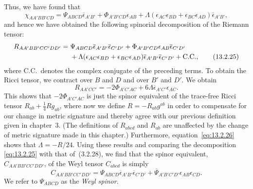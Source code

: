 Thus, we have found that
\begin{equation}
  \chi_{AA'BB'CD}
  =\Psi_{ABCD}\overline\epsilon_{A'B'}
   +\Phi_{A'B'CD}\epsilon_{AB}
   +\Lambda(\epsilon_{AC}\epsilon_{BD}+\epsilon_{BC}\epsilon_{AD})
    \overline\epsilon_{A'B'},
  \tag{13.2.24}\label{eq:13.2.24}
\end{equation}
and hence we have obtained the following spinorial decomposition of the Riemann
tensor:
\begin{align}
  R_{AA'BB'CC'DD'}
  ={}&\Psi_{ABCD}\overline\epsilon_{A'B'}\overline\epsilon_{C'D'}
    +\Phi_{A'B'CD}\epsilon_{AB}\overline\epsilon_{C'D'}\notag\\
   &{}+\Lambda(\epsilon_{AC}\epsilon_{BD}+\epsilon_{BC}\epsilon_{AD})
      \overline\epsilon_{A'B'}\overline\epsilon_{C'D'}
    +\text{C.C.},
  \tag{13.2.25}\label{eq:13.2.25}
\end{align}
where C.C.\ denotes the complex conjugate of the preceding terms. To obtain the
Ricci tensor, we contract over \(B\) and \(D\) and over \(B'\) and \(D'\). We obtain
\begin{equation}
  R_{AA'CC'}=-2\Phi_{A'C'AC}
    +6\Lambda\overline\epsilon_{A'C'}\epsilon_{AC}.
  \tag{13.2.26}\label{eq:13.2.26}
\end{equation}
This shows that \(-2\Phi_{A'C'AC}\) is just the spinor equivalent of the trace-free
Ricci tensor \(R_{ab}+\frac14Rg_{ab}\), where now we define
\(R=-R_{ab}g^{ab}\) in order to compensate for our change in metric signature and
thereby agree with our previous definition given in chapter~3. (The definitions of
\(R_{abcd}\) and \(R_{ab}\) are unaffected by the change of metric signature made
in this chapter.) Furthermore, equation~\eqref{eq:13.2.26} shows that
\(\Lambda=-R/24\). Using these results and comparing the decomposition
\eqref{eq:13.2.25} with that of~(3.2.28), we find that the spinor equivalent,
\(C_{AA'BB'CC'DD'}\), of the Weyl tensor \(C_{abcd}\) is simply
\begin{equation}
  C_{AA'BB'CC'DD'}
  =\Psi_{ABCD}\overline\epsilon_{A'B'}\overline\epsilon_{C'D'}
   +\overline\Psi_{A'B'C'D'}\epsilon_{AB}\epsilon_{CD}.
  \tag{13.2.27}\label{eq:13.2.27}
\end{equation}
We refer to \(\Psi_{ABCD}\) as the \emph{Weyl spinor}.

